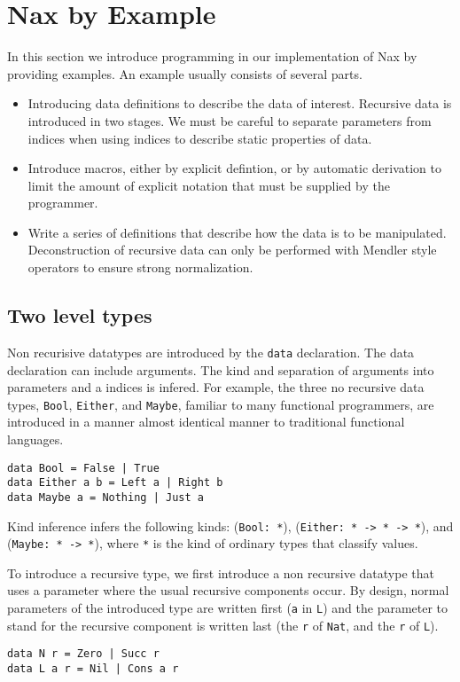 
\section{Nax by Example}\label{sec:bg}

In this section we introduce programming in our implementation of Nax by providing
examples. An example usually consists of several parts.

\begin{itemize}
\item Introducing data definitions to describe the data of interest. Recursive
data is introduced in two stages. We must be careful to separate parameters
from indices when using indices to describe static properties of data.

\item Introduce macros, either by explicit defintion, or by automatic derivation
to limit the amount of explicit notation that must be supplied by the programmer.

\item Write a series of definitions that describe how the data is to be
manipulated. Deconstruction of recursive data can only be performed with Mendler style operators
to ensure strong normalization.

\end{itemize}

\subsection{Two level types}
Non recurisive datatypes are introduced by the \verb+data+ declaration.
The data declaration can include arguments. The kind and separation of
arguments into parameters and a indices is infered. For example, 
the three no recursive data types, \verb+Bool+, \verb+Either+, and 
\verb+Maybe+, familiar to many functional programmers, are introduced
in a manner almost identical manner to traditional functional languages.
{\small
\begin{verbatim}   
data Bool = False | True
data Either a b = Left a | Right b
data Maybe a = Nothing | Just a
\end{verbatim}}
Kind inference infers the following kinds:
(\verb+Bool: *+),  (\verb+Either: * -> * -> *+), and 
(\verb+Maybe: * -> *+), where \verb+*+ is the kind of ordinary types that
classify values.

To introduce a recursive type, we first introduce a non recursive datatype
that uses a parameter where the usual recursive components occur. By design,
normal parameters of the introduced type are written first (\verb+a+ in \verb+L+)
and the parameter to stand for the recursive component is written last
(the \verb+r+ of \verb+Nat+, and the \verb+r+ of \verb+L+).
{\small
\begin{verbatim}
data N r = Zero | Succ r  
data L a r = Nil | Cons a r       
\end{verbatim}}

